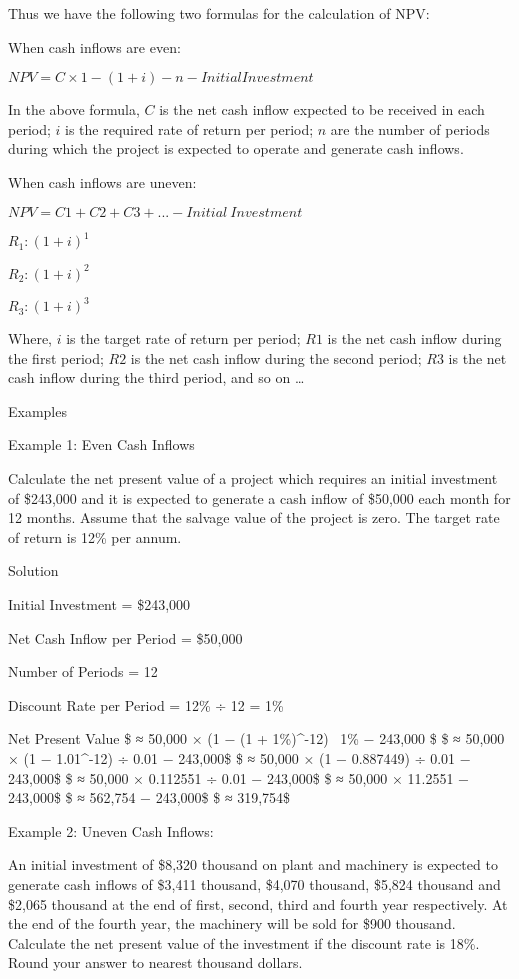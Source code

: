 \documentclass[]{book}
\theoremstyle{definition}
\theoremstyle{definition}
\theoremstyle{definition}
\theoremstyle{remark}
\begin{document}
Thus we have the following two formulas for the calculation of NPV:

When cash inflows are even:

\(NPV = C × 1 − (1 + i)-n − Initial Investment\)

In the above formula, \(C\) is the net cash inflow expected to be
received in each period; \(i\) is the required rate of return per
period; \(n\) are the number of periods during which the project is
expected to operate and generate cash inflows.

When cash inflows are uneven:

\(NPV = C1 + C2 + C3 + ... − Initial \ Investment\)

\(R_1:(1 + i)^1\)

\(R_2:(1 + i)^2\)

\(R_3:(1 + i)^3\)

Where, \(i\) is the target rate of return per period; \(R1\) is the net
cash inflow during the first period; \(R2\) is the net cash inflow
during the second period; \(R3\) is the net cash inflow during the third
period, and so on \ldots{}

Examples

Example 1: Even Cash Inflows

Calculate the net present value of a project which requires an initial
investment of \$243,000 and it is expected to generate a cash inflow of
\$50,000 each month for 12 months. Assume that the salvage value of the
project is zero. The target rate of return is 12\% per annum.

Solution

Initial Investment = \$243,000

Net Cash Inflow per Period = \$50,000

Number of Periods = 12

Discount Rate per Period = 12\% ÷ 12 = 1\%

Net Present Value \$ ≈ 50,000 × (1 − (1 + 1\%)\^{}-12) ~1\% − 243,000 \$
\$ ≈ 50,000 × (1 − 1.01\^{}-12) ÷ 0.01 − 243,000\$ \$ ≈ 50,000 × (1 −
0.887449) ÷ 0.01 − 243,000\$ \$ ≈ 50,000 × 0.112551 ÷ 0.01 − 243,000\$
\$ ≈ 50,000 × 11.2551 − 243,000\$ \$ ≈ 562,754 − 243,000\$ \$ ≈
319,754\$

Example 2: Uneven Cash Inflows:

An initial investment of \$8,320 thousand on plant and machinery is
expected to generate cash inflows of \$3,411 thousand, \$4,070 thousand,
\$5,824 thousand and \$2,065 thousand at the end of first, second, third
and fourth year respectively. At the end of the fourth year, the
machinery will be sold for \$900 thousand. Calculate the net present
value of the investment if the discount rate is 18\%. Round your answer
to nearest thousand dollars.
\end{document}
